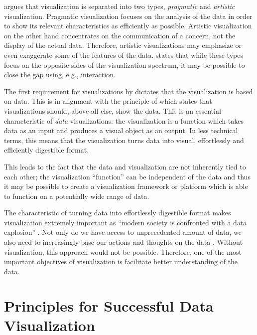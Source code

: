 \citet[chap.~4]{kosara_visualization_2007} argues that visualization is separated into two types, \emph{pragmatic} and \emph{artistic} visualization.  Pragmatic visualization focuses on the analysis of the data in order to show its relevant characteristics as efficiently as possible. Artistic visualization on the other hand concentrates on the communication of a concern, not the display of the actual data. Therefore, artistic visualizations may emphasize or even exaggerate some of the features of the data. \citeauthor{kosara_visualization_2007} states that while these types focus on the opposite sides of the visualization spectrum, it may be possible to close the gap using, e.g., interaction.

The first requirement for visualizations by \citet{kosara_visualization_2007} dictates that the visualization is based on data. This is in alignment with the principle of \citet{tufte_visual_1986} which states that visualizations should, above all else, show the data. This is an essential characteristic of \emph{data} visualizations: the visualization is a function which takes data as an input and produces a visual object as an output. In less technical terms, this means that the visualization turns data into visual, effortlessly and efficiently digestible format.

This leads to the fact that the data and visualization are not inherently tied to each other; the visualization ``function'' can be independent of the data and thus it may be possible to create a visualization framework or platform which is able to function on a potentially wide range of data.

The characteristic of turning data into effortlessly digestible format makes visualization extremely important as ``modern society is confronted with a data explosion'' \citep{van_wijk_value_2005}. Not only do we have access to unprecedented amount of data, we also need to increasingly base our actions and thoughts on the data \citep{van_wijk_value_2005}. Without visualization, this approach would not be possible. Therefore, one of the most important objectives of visualization is facilitate better understanding of the data.


\section{Principles for Successful Data Visualization}
\label{section:visualizationprinciples}

